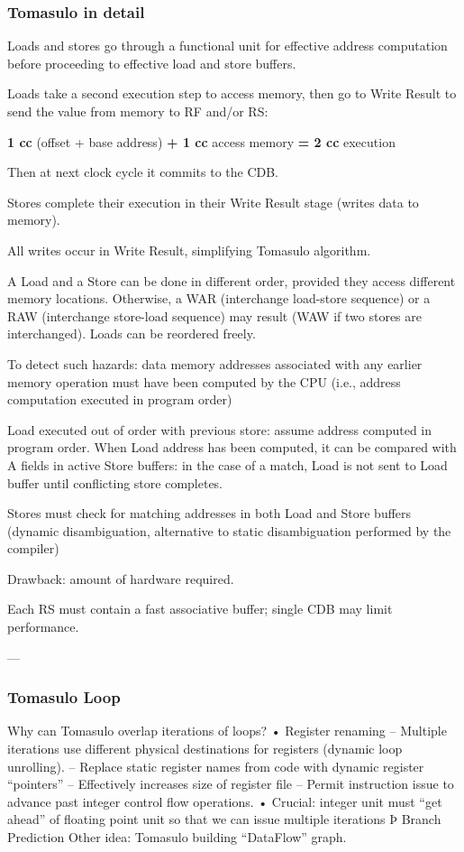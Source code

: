 \subsubsection{Tomasulo in detail}
Loads and stores go through a functional unit
for effective address computation before
proceeding to effective load and store buffers.

Loads take a second execution step to access
memory, then go to Write Result to send the
value from memory to RF and/or RS:
\begin{center}
    \textbf{1 cc} (offset + base address) \textbf{+ 1 cc} access memory \textbf{= 2 cc}
    execution
\end{center}
Then at next clock cycle it commits to the CDB\@.

Stores complete their execution in their Write
Result stage (writes data to memory).

All writes occur in Write Result, simplifying
Tomasulo algorithm.

A Load and a Store can be done in different
order, provided they access different memory
locations.
Otherwise, a WAR (interchange load-store
sequence) or a RAW (interchange store-load
sequence) may result (WAW if two stores are
interchanged).
Loads can be reordered freely.

To detect such hazards: data memory
addresses associated with any earlier memory
operation must have been computed by the
CPU (i.e., address computation executed in
program order)

Load executed out of order with previous store:
assume address computed in program order.
When Load address has been computed, it
can be compared with A fields in active Store
buffers: in the case of a match, Load is not sent
to Load buffer until conflicting store completes.

Stores must check for matching addresses in
both Load and Store buffers (dynamic
disambiguation, alternative to static
disambiguation performed by the compiler)

Drawback: amount of hardware required.

Each RS must contain a fast associative buffer;
single CDB may limit performance.

---

\subsubsection{Tomasulo Loop}
Why can Tomasulo overlap iterations of loops?
• Register renaming
– Multiple iterations use different physical destinations for registers
(dynamic loop unrolling).
– Replace static register names from code with dynamic register
“pointers”
– Effectively increases size of register file
– Permit instruction issue to advance past integer control flow
operations.
• Crucial: integer unit must “get ahead” of floating
point unit so that we can issue multiple iterations
Þ Branch Prediction
Other idea: Tomasulo building “DataFlow” graph.

